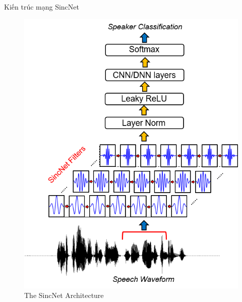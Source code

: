 \documentclass[notheorems, aspectratio=54]{beamer}
\begin{document}
\begin{frame}{Kiến trúc mạng SincNet}
	\begin{figure}[H]
		\includegraphics[width=0.4\linewidth]{images/SincNet.png}
		\caption{The SincNet Architecture}
		\label{fig:writing-thesis}
	\end{figure}
\end{frame}
\end{document}
